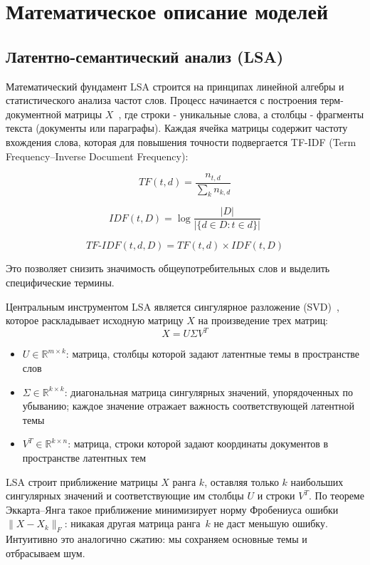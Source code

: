\section{Математическое описание моделей}

\subsection{Латентно-семантический анализ (LSA)}

Математический фундамент LSA строится на принципах линейной алгебры и
статистического анализа частот слов. Процесс начинается с построения
терм-документной матрицы \( X \)~\cite{deerwester1990lsa}, где строки -
уникальные слова, а столбцы -
фрагменты текста (документы или параграфы). Каждая ячейка матрицы содержит
частоту вхождения слова, которая для повышения точности подвергается
TF-IDF (Term Frequency–Inverse Document Frequency):

\[
  TF(t, d) = \frac{n_{t,d}}{\sum_{k} n_{k,d}}
\]

\[
  IDF(t, D) = \log \frac{|D|}{|\{d \in D : t \in d\}|}
\]

\[
  TF\text{-}IDF(t, d, D) = TF(t, d) \times IDF(t, D)
\]

Это позволяет снизить значимость общеупотребительных слов и выделить
специфические термины.

Центральным инструментом LSA является сингулярное разложение
(SVD)~\cite{landauer2004paragraph}, которое
раскладывает исходную матрицу \( X \) на произведение трех матриц:
\[
  X = U \Sigma V^T
\]
\begin{itemize}
  \item \( U \in \mathbb{R}^{m \times k} \): матрица, столбцы которой
    задают латентные темы в пространстве слов
  \item \( \Sigma \in \mathbb{R}^{k \times k} \): диагональная матрица
    сингулярных значений, упорядоченных по убыванию; каждое значение
    отражает важность соответствующей латентной темы
  \item \( V^T \in \mathbb{R}^{k \times n} \): матрица, строки которой
    задают координаты документов в пространстве латентных тем
\end{itemize}

LSA строит приближение матрицы \( X \) ранга \( k \), оставляя
только \( k \) наибольших сингулярных значений и соответствующие им
столбцы \( U \) и строки \( V^T \). По теореме Эккарта--Янга такое
приближение минимизирует норму Фробениуса ошибки
\( \|X - X_k\|_F \): никакая другая матрица ранга~\( k \) не даст
меньшую ошибку. Интуитивно это аналогично сжатию: мы сохраняем
основные темы и отбрасываем шум.

